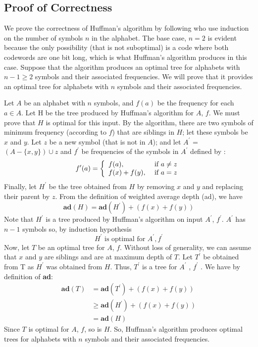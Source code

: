 \documentclass[12pt, authoryear]{elsarticle}
\begin{document}
\subsection{Proof of Correctness}

We prove the correctness of Huffman’s algorithm by following \cite{huff_correctness} who use induction on the number of symbols $n$ in the alphabet. The base case, $n = 2$  is evident because the only possibility (that is not suboptimal) is a code where both codewords are one bit long, which is what Huffman’s algorithm produces in this case. Suppose that the algorithm produces an optimal tree for alphabets with $n - 1 \geq     2$ symbols and their associated frequencies. We will prove that it provides an optimal tree for alphabets with $n$ symbols and their associated frequencies.

Let $A$ be an alphabet with $n$ symbols,  and $f(a)$ be the frequency for each $a \in A$. Let H be the tree produced by Huffman’s algorithm for $A$, $f$. We must prove that $H$ is optimal for this input.
By the algorithm, there are two symbols of minimum frequency (according to $f$) that are siblings in $H$;
let these symbols be $x$ and $y$. Let $z$ be a new symbol (that is not in $A$); and let $A^{\prime}$ = $(A - \{x, y\}) \cup {z}$ and $f^{\prime}$ be frequencies of the symbols in $A^{\prime}$ defined by :
\[
f ^ { \prime } ( a ) = \left\{ \begin{array} { l l } { f ( a ) , } & { \text { if } a \neq z } \\ { f ( x ) + f ( y ) , } & { \text { if } a = z } \end{array} \right.
\]
Finally, let $H^{\prime}$ be the tree obtained from $H$ by removing $x$ and $y$ and replacing their parent by $z$. From the definition of weighted average depth (ad), we have
\[
\mathbf { a d } ( H ) = \mathbf { a d } \left( H ^ { \prime } \right) + ( f ( x ) + f ( y ) )
\]
Note that $H^{\prime}$ is a tree produced by Huffman's algorithm on input $A^{\prime}$, $f^{\prime}$. $A^{\prime}$ has $n - 1$ symbols so, by induction hypothesis
\[
H ^ { \prime } \text { is optimal for } A ^ { \prime } , f ^ { \prime }
\]
Now, let $T$ be an optimal tree for $A$, $f$. Without loss of generality, we can assume that $x$ and $y$ are siblings and are at maximum depth of $T$.  Let $T^{\prime}$  be obtained from T as $H^{\prime}$  was obtained from $H$. Thus, $T^{\prime}$ is a tree for $A^{\prime}$ , $f^{\prime}$ . We have by definition of \textbf{ad}:
\[
\begin{aligned} \mathbf { a } \mathbf { d } ( T ) & = \mathbf { a d } \left( T ^ { \prime } \right) + ( f ( x ) + f ( y ) ) \\ & \geq \mathbf { a d } \left( H ^ { \prime } \right) + ( f ( x ) + f ( y ) ) \\ & = \mathbf { a d } ( H ) \end{aligned}
\]
Since $T$ is optimal for $A$, $f$, so is $H$. So, Huffman's algorithm produces optimal trees for alphabets with $n$ symbols and their associated frequencies.
\end{document}
